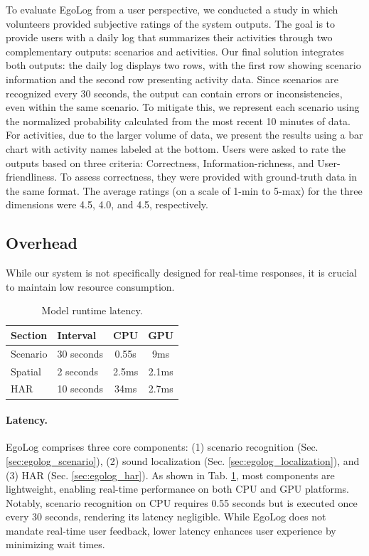 To evaluate EgoLog from a user perspective, we conducted a study in which volunteers provided subjective ratings of the system outputs. The goal is to provide users with a daily log that summarizes their activities through two complementary outputs: scenarios and activities.
Our final solution integrates both outputs: the daily log displays two rows, with the first row showing scenario information and the second row presenting activity data. Since scenarios are recognized every 30 seconds, the output can contain errors or inconsistencies, even within the same scenario. To mitigate this, we represent each scenario using the normalized probability calculated from the most recent 10 minutes of data. 
For activities, due to the larger volume of data, we present the results using a bar chart with activity names labeled at the bottom.
Users were asked to rate the outputs based on three criteria: Correctness, Information-richness, and User-friendliness. To assess correctness, they were provided with ground-truth data in the same format. The average ratings (on a scale of 1-min to 5-max) for the three dimensions were 4.5, 4.0, and 4.5, respectively.


\subsection{Overhead}
While our system is not specifically designed for real-time responses, it is crucial to maintain low resource consumption.

\begin{table}[h]
\centering
\vspace{-0.5em}
\caption{Model runtime latency.}
\vspace{-0.5em}
\label{tab:latency}
\begin{tabular}{llcc}
\toprule
\textbf{Section} & \textbf{Interval} & \textbf{CPU} & \textbf{GPU} \\
\midrule
Scenario & 30 seconds & 0.55s & 9ms \\
Spatial & 2 seconds & 2.5ms & 2.1ms \\
HAR  & 10 seconds & 34ms & 2.7ms \\
\bottomrule
\end{tabular}
\vspace{-0.5em}
\end{table}

\paragraph{Latency.}
EgoLog comprises three core components: (1) scenario recognition (Sec. \ref{sec:egolog_scenario}), (2) sound localization (Sec. \ref{sec:egolog_localization}), and (3) HAR (Sec. \ref{sec:egolog_har}). As shown in Tab. \ref{tab:latency}, most components are lightweight, enabling real-time performance on both CPU and GPU platforms. Notably, scenario recognition on CPU requires 0.55 seconds but is executed once every 30 seconds, rendering its latency negligible. While EgoLog does not mandate real-time user feedback, lower latency enhances user experience by minimizing wait times.


